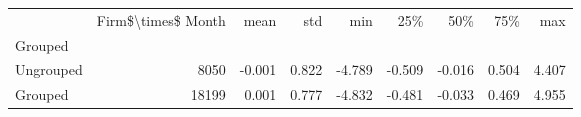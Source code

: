 \begin{tabular}{lrrrrrrrr}
\toprule
{} &  Firm\$\textbackslash times\$ Month &   mean &    std &    min &    25\% &    50\% &    75\% &    max \\
Grouped   &                     &        &        &        &        &        &        &        \\
\midrule
Ungrouped &                8050 & -0.001 &  0.822 & -4.789 & -0.509 & -0.016 &  0.504 &  4.407 \\
Grouped   &               18199 &  0.001 &  0.777 & -4.832 & -0.481 & -0.033 &  0.469 &  4.955 \\
\bottomrule
\end{tabular}

